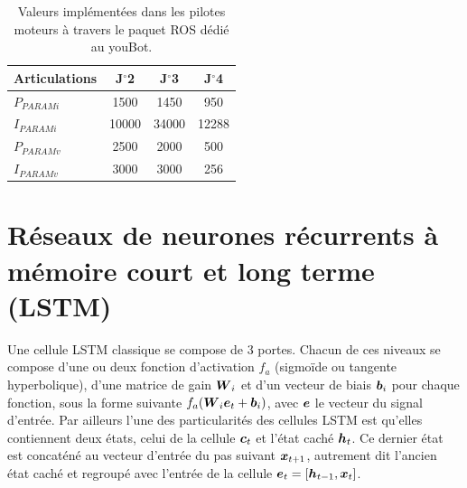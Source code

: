 \begin{appendices}
	\begin{table}
		\centering
		\begin{tabular}{| l | c  c  c | } 
			\hline
			Articulations & J$^{\circ}$2 & J$^{\circ}$3 & J$^{\circ}$4 \\ \hline
			$P_{PARAMi}$ & 1500 & 1450 & 950 \\ \hline
			$I_{PARAMi}$ & 10000 & 34000 & 12288 \\ \hline
			$P_{PARAMv}$ & 2500 & 2000 & 500 \\ \hline
			$I_{PARAMv}$ & 3000 & 3000 & 256 \\ 
			\hline
		\end{tabular} %
		\caption{Valeurs implémentées dans les pilotes moteurs à travers le paquet ROS dédié au youBot.}
		\label{tab_joint_ctrl_gains}
	\end{table}

	\chapter[LSTM]{Réseaux de neurones récurrents à mémoire court et long terme (LSTM)} \label{app_lstm_rnn}
	
	Une cellule LSTM classique se compose de 3 portes. %
	Chacun de ces niveaux se compose d'une ou deux fonction d'activation $f_a$ (sigmoïde ou tangente hyperbolique), d'une matrice de gain $\matr{W}_i$ et d'un vecteur de biais $\vect{b}_i$ pour chaque fonction, sous la forme suivante $f_a(\matr{W}_i \vect{e}_t + \vect{b}_i)$, avec $\vect{e}$ le vecteur du signal d'entrée. Par ailleurs l'une des particularités des cellules LSTM est qu'elles contiennent deux états, celui de la cellule $\vect{c}_t$ et l'état caché $\vect{h}_t$. Ce dernier état est concaténé au vecteur d'entrée du pas suivant $\vect{x}_{t+1}$, autrement dit l'ancien état caché et regroupé avec l'entrée de la cellule $\vect{e}_t = [\vect{h}_{t-1}, \vect{x}_{t}]$.
	

\end{appendices}
